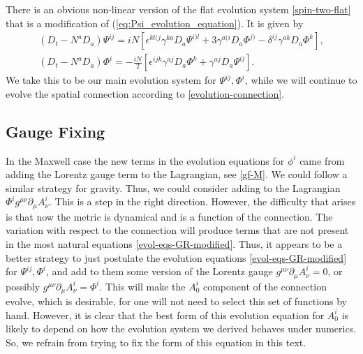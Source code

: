 \documentclass[10pt]{report}
\theoremstyle{definition}
\begin{document}
There is an obvious non-linear version of the flat evolution system \cref{spin-two-flat} that is a modification of (\ref{eq:Psi_evolution_equation}). It is given by
\begin{align}\label{evol-eqs-GR-modified}
 ( D_t - N^a D_a) \Psi^{ij} = i N \left[ \epsilon^{kl(j} \gamma^{k a} 
 D_a \Psi^{i)l} + 3 \gamma^{a(i} D_a \Phi^{j)} - \delta^{ij}\gamma^{a k} D_a \Phi^{k} \right],
\\ \nonumber
  ( D_t - N^a D_a)  \Phi^i = -\frac{i N}{2} \left[ \epsilon^{ijk}\gamma^{aj} D_a \Phi^k + \gamma^{aj} D_a \Psi^{ij}  \right].
\end{align}
We take this to be our main evolution system for $\Psi^{ij}, \Phi^i$, while we will continue to evolve  the spatial connection according to \cref{evolution-connection}. 

\subsection{Gauge Fixing}

In the Maxwell case the new terms in the evolution equations for $\phi^i$ came from adding the Lorentz gauge term to the Lagrangian, see \cref{gf-M}. We could follow a similar strategy for gravity. Thus, we could consider adding to the Lagrangian $\Phi^i g^{\mu\nu} \partial_\mu A_\nu^i$. This is a step in the right direction. However, the difficulty that arises is that now the metric is dynamical and is a function of the connection. The variation with respect to the connection will produce terms that are not present in the most natural equations \cref{evol-eqs-GR-modified}. Thus, it appears to be a better strategy to just postulate the evolution equations \cref{evol-eqs-GR-modified} for $\Psi^{ij}, \Phi^i$, and add to them some version of the Lorentz gauge $g^{\mu\nu} \partial_\mu A_\nu^i=0$, or possibly $g^{\mu\nu} \partial_\mu A_\nu^i=\Phi^i$. This will make the $A_0^i$ component of the connection evolve, which is desirable, for one will not need to select this set of functions by hand. However, it is clear that the best form of this evolution equation for $A_0^i$ is likely to depend on how the evolution system we derived behaves under numerics. So, we refrain from trying to fix the form of this equation in this text. 
\end{document}
